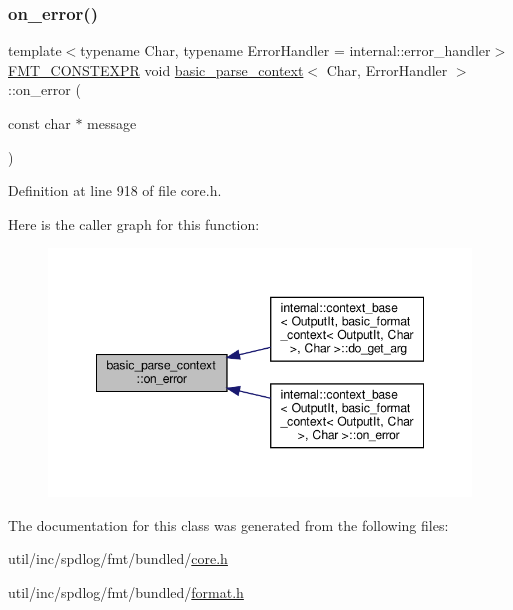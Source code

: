 \subsubsection{\texorpdfstring{on\+\_\+error()}{on\_error()}}
{\footnotesize\ttfamily template$<$typename Char, typename Error\+Handler = internal\+::error\+\_\+handler$>$ \\
\hyperlink{core_8h_a69201cb276383873487bf68b4ef8b4cd}{F\+M\+T\+\_\+\+C\+O\+N\+S\+T\+E\+X\+PR} void \hyperlink{classbasic__parse__context}{basic\+\_\+parse\+\_\+context}$<$ Char, Error\+Handler $>$\+::on\+\_\+error (\begin{DoxyParamCaption}\item[{const char $\ast$}]{message }\end{DoxyParamCaption})\hspace{0.3cm}{\ttfamily [inline]}}



Definition at line 918 of file core.\+h.

Here is the caller graph for this function\+:
\nopagebreak
\begin{figure}[H]
\begin{center}
\leavevmode
\includegraphics[width=348pt]{classbasic__parse__context_aaef39fb2abf13cfee75cdc54519c5322_icgraph}
\end{center}
\end{figure}


The documentation for this class was generated from the following files\+:\begin{DoxyCompactItemize}
\item 
util/inc/spdlog/fmt/bundled/\hyperlink{core_8h}{core.\+h}\item 
util/inc/spdlog/fmt/bundled/\hyperlink{format_8h}{format.\+h}\end{DoxyCompactItemize}
